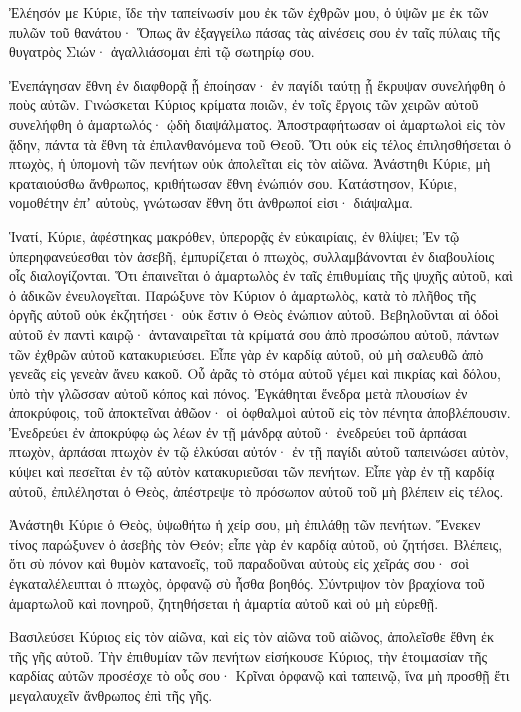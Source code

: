 \begin{spacing}{1.1}
\begin{multicols}{2}
Ἐλέησόν με Κύριε, ἴδε τὴν ταπείνωσίν μου ἐκ τῶν ἐχθρῶν μου, ὁ ὑψῶν με ἐκ τῶν πυλῶν τοῦ θανάτου·
Ὅπως ἂν ἐξαγγείλω πάσας τὰς αἰνέσεις σου ἐν ταῖς πύλαις τῆς θυγατρὸς Σιών· ἀγαλλιάσομαι ἐπὶ τῷ σωτηρίῳ σου.

Ἐνεπάγησαν ἔθνη ἐν διαφθορᾷ ᾗ ἐποίησαν· ἐν παγίδι ταύτῃ ᾗ ἔκρυψαν συνελήφθη ὁ ποὺς αὐτῶν.
Γινώσκεται Κύριος κρίματα ποιῶν, ἐν τοῖς ἔργοις τῶν χειρῶν αὐτοῦ συνελήφθη ὁ ἁμαρτωλός· ᾠδὴ διαψάλματος.
Ἀποστραφήτωσαν οἱ ἁμαρτωλοὶ εἰς τὸν ᾅδην, πάντα τὰ ἔθνη τὰ ἐπιλανθανόμενα τοῦ Θεοῦ.
Ὅτι οὐκ εἰς τέλος ἐπιλησθήσεται ὁ πτωχὸς, ἡ ὑπομονὴ τῶν πενήτων οὐκ ἀπολεῖται εἰς τὸν αἰῶνα.
Ἀνάστηθι Κύριε, μὴ κραταιούσθω ἄνθρωπος, κριθήτωσαν ἔθνη ἐνώπιόν σου.
Κατάστησον, Κύριε, νομοθέτην ἐπʼ αὐτοὺς, γνώτωσαν ἔθνη ὅτι ἀνθρωποί εἰσι· διάψαλμα.

Ἱνατί, Κύριε, ἀφέστηκας μακρόθεν, ὑπερορᾷς ἐν εὐκαιρίαις, ἐν θλίψει;
Ἐν τῷ ὑπερηφανεύεσθαι τὸν ἀσεβῆ, ἐμπυρίζεται ὁ πτωχὸς, συλλαμβάνονται ἐν διαβουλίοις οἷς διαλογίζονται.
Ὅτι ἐπαινεῖται ὁ ἁμαρτωλὸς ἐν ταῖς ἐπιθυμίαις τῆς ψυχῆς αὐτοῦ, καὶ ὁ ἀδικῶν ἐνευλογεῖται.
Παρώξυνε τὸν Κύριον ὁ ἁμαρτωλὸς, κατὰ τὸ πλῆθος τῆς ὀργῆς αὐτοῦ οὐκ ἐκζητήσει· οὐκ ἔστιν ὁ Θεὸς ἐνώπιον αὐτοῦ.
Βεβηλοῦνται αἱ ὁδοὶ αὐτοῦ ἐν παντὶ καιρῷ· ἀνταναιρεῖται τὰ κρίματά σου ἀπὸ προσώπου αὐτοῦ, πάντων τῶν ἐχθρῶν αὐτοῦ κατακυριεύσει.
Εἶπε γὰρ ἐν καρδίᾳ αὐτοῦ, οὐ μὴ σαλευθῶ ἀπὸ γενεᾶς εἰς γενεὰν ἄνευ κακοῦ.
Οὗ ἀρᾶς τὸ στόμα αὐτοῦ γέμει καὶ πικρίας καὶ δόλου, ὑπὸ τὴν γλῶσσαν αὐτοῦ κόπος καὶ πόνος.
Ἐγκάθηται ἔνεδρα μετὰ πλουσίων ἐν ἀποκρύφοις, τοῦ ἀποκτεῖναι ἀθῶον· οἱ ὀφθαλμοὶ αὐτοῦ εἰς τὸν πένητα ἀποβλέπουσιν.
Ἐνεδρεύει ἐν ἀποκρύφῳ ὡς λέων ἐν τῇ μάνδρᾳ αὐτοῦ· ἐνεδρεύει τοῦ ἁρπάσαι πτωχὸν, ἁρπάσαι πτωχὸν ἐν τῷ ἑλκύσαι αὐτόν· ἐν τῇ παγίδι αὐτοῦ
ταπεινώσει αὐτὸν, κύψει καὶ πεσεῖται ἐν τῷ αὐτὸν κατακυριεῦσαι τῶν πενήτων.
Εἶπε γὰρ ἐν τῇ καρδίᾳ αὐτοῦ, ἐπιλέλησται ὁ Θεὸς, ἀπέστρεψε τὸ πρόσωπον αὐτοῦ τοῦ μὴ βλέπειν εἰς τέλος.

Ἀνάστηθι Κύριε ὁ Θεὸς, ὑψωθήτω ἡ χείρ σου, μὴ ἐπιλάθῃ τῶν πενήτων.
Ἕνεκεν τίνος παρώξυνεν ὁ ἀσεβὴς τὸν Θεόν; εἶπε γὰρ ἐν καρδίᾳ αὐτοῦ, οὐ ζητήσει.
Βλέπεις, ὅτι σὺ πόνον καὶ θυμὸν κατανοεῖς, τοῦ παραδοῦναι αὐτοὺς εἰς χεῖράς σου· σοὶ ἐγκαταλέλειπται ὁ πτωχὸς, ὀρφανῷ σὺ ἦσθα βοηθός.
Σύντριψον τὸν βραχίονα τοῦ ἁμαρτωλοῦ καὶ πονηροῦ, ζητηθήσεται ἡ ἁμαρτία αὐτοῦ καὶ οὐ μὴ εὑρεθῇ.

Βασιλεύσει Κύριος εἰς τὸν αἰῶνα, καὶ εἰς τὸν αἰῶνα τοῦ αἰῶνος, ἀπολεῖσθε ἔθνη ἐκ τῆς γῆς αὐτοῦ.
Τὴν ἐπιθυμίαν τῶν πενήτων εἰσήκουσε Κύριος, τὴν ἑτοιμασίαν τῆς καρδίας αὐτῶν προσέσχε τὸ οὖς σου·
Κρῖναι ὀρφανῷ καὶ ταπεινῷ, ἵνα μὴ προσθῇ ἔτι μεγαλαυχεῖν ἄνθρωπος ἐπὶ τῆς γῆς.


\end{multicols}
\end{spacing}
